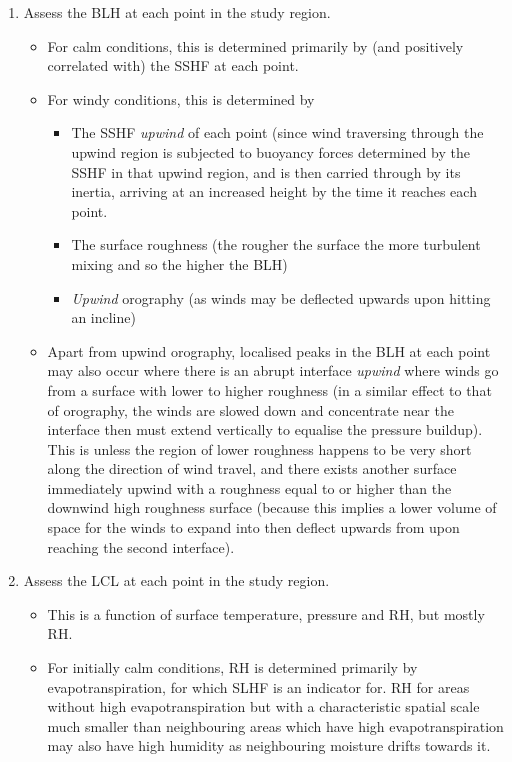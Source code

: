 \begin{enumerate}
	\item Assess the \ac{BLH} at each point in the study region.
	\begin{itemize}
		\item For calm conditions, this is determined primarily by (and positively correlated with) the \ac{SSHF} at each point.
		\item For windy conditions, this is determined by
		\begin{itemize}
			\item The \ac{SSHF} \textit{upwind} of each point (since wind traversing through the upwind region is subjected to buoyancy forces determined by the \ac{SSHF} in that upwind region, and is then carried through by its inertia, arriving at an increased height by the time it reaches each point.
			\item The surface roughness (the rougher the surface the more turbulent mixing and so the higher the \ac{BLH})
			\item \textit{Upwind} orography (as winds may be deflected upwards upon hitting an incline)
		\end{itemize}
		\item Apart from upwind orography, localised peaks in the \ac{BLH} at each point may also occur where there is an abrupt interface \textit{upwind} where winds go from a surface with lower to higher roughness (in a similar effect to that of orography, the winds are slowed down and concentrate near the interface then must extend vertically to equalise the pressure buildup). This is unless the region of lower roughness happens to be very short along the direction of wind travel, and there exists another surface immediately upwind with a roughness equal to or higher than the downwind high roughness surface (because this implies a lower volume of space for the winds to expand into then deflect upwards from upon reaching the second interface).
		\end{itemize}
	\item Assess the \ac{LCL} at each point in the study region.
	\begin{itemize}
		\item This is a function of surface temperature, pressure and \ac{RH}, but mostly \ac{RH}.
		\item For initially calm conditions, \ac{RH} is determined primarily by evapotranspiration, for which \ac{SLHF} is an indicator for. \ac{RH} for areas without high evapotranspiration but with a characteristic spatial scale much smaller than neighbouring areas which have high evapotranspiration may also have high humidity as neighbouring moisture drifts towards it.

\end{itemize}
\end{enumerate}
